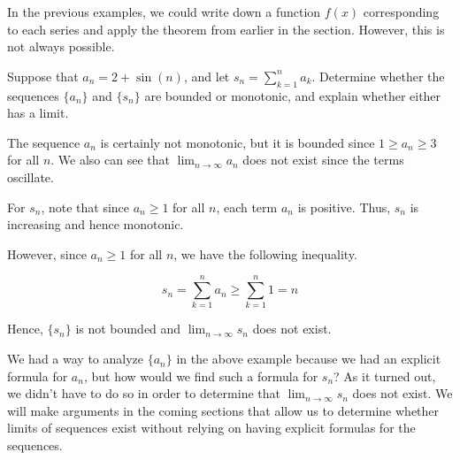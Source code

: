 \documentclass{ximera}
\begin{document}
In the previous examples, we could write down a function $f(x)$ corresponding to each series and apply the theorem from earlier in the section.  However, this is not always possible.

\begin{example}
Suppose that $a_n = 2 + \sin(n)$, and let $s_n = \sum_{k=1}^{n} a_k$.  Determine whether the sequences $\{a_n\}$ and $\{s_n\}$ are bounded or monotonic, and explain whether either has a limit.

\begin{explanation}
The sequence $a_n$ is certainly not monotonic, but it  is bounded since $1 \geq a_n \geq 3$ for all $n$.  We also can see that $\lim_{n \to \infty} a_n$ does not exist since the terms oscillate.

For $s_n$, note that since $a_n \geq 1$ for all $n$, each term $a_n$ is positive.  Thus, $s_n$ is increasing and hence monotonic.  

However, since $a_n\geq1$ for all $n$, we have the following inequality.

\[s_n = \sum_{k=1}^n a_n \geq \sum_{k=1}^n 1 = n\]

Hence, $\{s_n\}$ is not bounded and $\lim_{n \to \infty} s_n$ does not exist.
\end{explanation}
\end{example}

\begin{remark}
We had a way to analyze $\{a_n\}$ in the above example because we had an explicit formula for $a_n$, but how would we find such a formula for $s_n$?  As it turned out, we didn't have to do so in order to determine that $\lim_{n \to \infty} s_n$ does not exist.  We will make arguments in the coming sections that allow us to determine whether limits of sequences exist without relying on having explicit formulas for the sequences.  
\end{remark}
\end{document}
